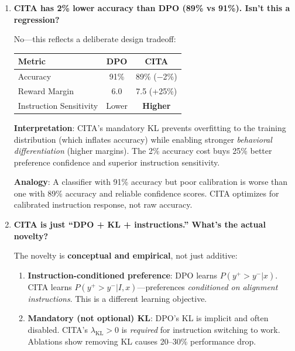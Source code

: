 \begin{enumerate}[label=\textbf{Q\arabic*.}, leftmargin=*, itemsep=8pt]
\vspace{4mm}

\item \textbf{CITA has 2\% lower accuracy than DPO (89\% vs 91\%). Isn't this a regression?}

 No---this reflects a deliberate design tradeoff:

\begin{table}[H]
\centering
\small
\renewcommand{\arraystretch}{1.2}
\begin{tabular}{@{}lcc@{}}
\toprule
\textbf{Metric} & \textbf{DPO} & \textbf{CITA} \\
\midrule
Accuracy & 91\% & 89\% ($-$2\%) \\ \hline
Reward Margin & 6.0 & 7.5 (+25\%) \\ \hline
Instruction Sensitivity & Lower & \textbf{Higher} \\
\bottomrule
\end{tabular}
\end{table}

\textbf{Interpretation}: CITA's mandatory KL prevents overfitting to the training distribution (which inflates accuracy) while enabling stronger \textit{behavioral differentiation} (higher margins). The 2\% accuracy cost buys 25\% better preference confidence and superior instruction sensitivity.

\textbf{Analogy}: A classifier with 91\% accuracy but poor calibration is worse than one with 89\% accuracy and reliable confidence scores. CITA optimizes for calibrated instruction response, not raw accuracy.

\vspace{4mm}

\item \textbf{CITA is just ``DPO + KL + instructions.'' What's the actual novelty?}

 The novelty is \textbf{conceptual and empirical}, not just additive:

\begin{enumerate}[leftmargin=*,itemsep=2pt]
    \item \textbf{Instruction-conditioned preference}: DPO learns $P(y^+ > y^- | x)$. CITA learns $P(y^+ > y^- | I, x)$---preferences \textit{conditioned on alignment instructions}. This is a different learning objective.

    \item \textbf{Mandatory (not optional) KL}: DPO's KL is implicit and often disabled. CITA's $\lambda_{\text{KL}} > 0$ is \textit{required} for instruction switching to work. Ablations show removing KL causes 20--30\% performance drop.


\end{enumerate}
\end{enumerate}
